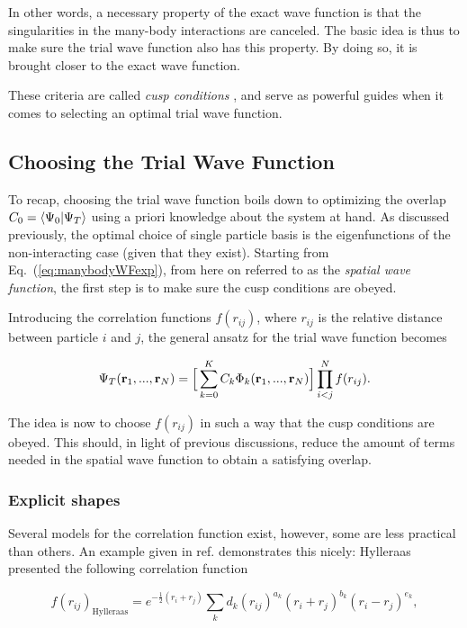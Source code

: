 In other words, a necessary property of the exact wave function is that the singularities in the many-body interactions are canceled. The basic idea is thus to make sure the trial wave function also has this property. By doing so, it is brought closer to the exact wave function.

These criteria are called \textit{cusp conditions} \cite{morten}, and serve as powerful guides when it comes to selecting an optimal trial wave function. 


\subsection{Choosing the Trial Wave Function}
\label{sec:ChoiceTrialWF}

To recap, choosing the trial wave function boils down to optimizing the overlap $C_0 = \left\langle \Psi_0 | \Psi_T\right\rangle$ using a priori knowledge about the system at hand. As discussed previously, the optimal choice of single particle basis is the eigenfunctions of the non-interacting case (given that they exist). Starting from Eq.~(\ref{eq:manybodyWFexp}), from here on referred to as the \textit{spatial wave function}, the first step is to make sure the cusp conditions are obeyed.

Introducing the correlation functions $f(r_{ij})$, where $r_{ij}$ is the relative distance between particle $i$ and $j$, the general ansatz for the trial wave function becomes

\begin{equation}
\label{eq:firstAnzatsTWF}
 \Psi_T(\mathbf{r}_1, ..., \mathbf{r}_N) = \Big[\sum_{k=0}^K C_k\Phi_k(\mathbf{r}_1, ..., \mathbf{r}_N)\Big]\prod_{i<j}^Nf(r_{ij}).
\end{equation}

The idea is now to choose $f(r_{ij})$ in such a way that the cusp conditions are obeyed. This should, in light of previous discussions, reduce the amount of terms needed in the spatial wave function to obtain a satisfying overlap.

\subsubsection{Explicit shapes}

Several models for the correlation function exist, however, some are less practical than others. An example given in ref. \cite{abInitioMC} demonstrates this nicely: Hylleraas presented the following correlation function 

\begin{equation}
 f(r_{ij})_\mathrm{Hylleraas} = e^{-\frac{1}{2} (r_i + r_j)}\sum_k d_k(r_{ij})^{a_k} (r_i + r_j)^{b_k}(r_i - r_j)^{e_k},
\end{equation}

